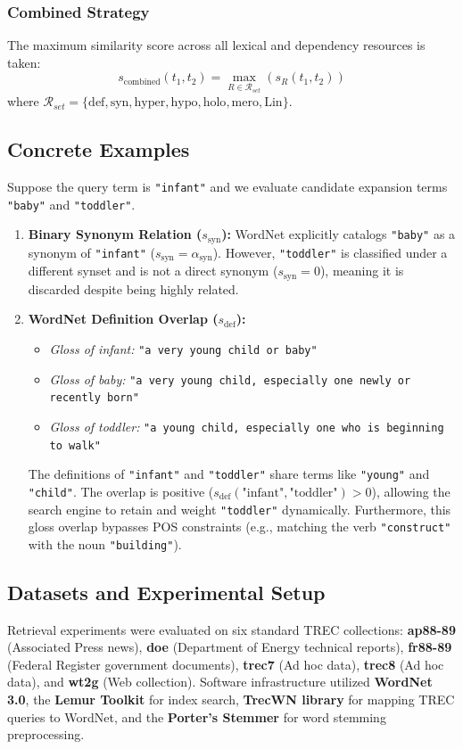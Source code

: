 \documentclass[11pt,a4paper]{article}
\begin{document}
\subsubsection{Combined Strategy}
The maximum similarity score across all lexical and dependency resources is taken:
\begin{equation}
s_{\text{combined}}(t_1, t_2) = \max_{R \in \mathcal{R}_{set}} (s_R(t_1, t_2))
\end{equation}
where $\mathcal{R}_{set} = \{\text{def}, \text{syn}, \text{hyper}, \text{hypo}, \text{holo}, \text{mero}, \text{Lin}\}$.

\subsection{Concrete Examples}
Suppose the query term is \texttt{"infant"} and we evaluate candidate expansion terms \texttt{"baby"} and \texttt{"toddler"}.
\begin{enumerate}
    \item \textbf{Binary Synonym Relation ($s_{\text{syn}}$):}
    WordNet explicitly catalogs \texttt{"baby"} as a synonym of \texttt{"infant"} ($s_{\text{syn}} = \alpha_{\text{syn}}$). However, \texttt{"toddler"} is classified under a different synset and is not a direct synonym ($s_{\text{syn}} = 0$), meaning it is discarded despite being highly related.
    \item \textbf{WordNet Definition Overlap ($s_{\text{def}}$):}
    \begin{itemize}
        \item \textit{Gloss of infant:} \texttt{"a very young child or baby"}
        \item \textit{Gloss of baby:} \texttt{"a very young child, especially one newly or recently born"}
        \item \textit{Gloss of toddler:} \texttt{"a young child, especially one who is beginning to walk"}
    \end{itemize}
    The definitions of \texttt{"infant"} and \texttt{"toddler"} share terms like \texttt{"young"} and \texttt{"child"}. The overlap is positive ($s_{\text{def}}(\text{"infant"}, \text{"toddler"}) > 0$), allowing the search engine to retain and weight \texttt{"toddler"} dynamically. Furthermore, this gloss overlap bypasses POS constraints (e.g., matching the verb \texttt{"construct"} with the noun \texttt{"building"}).
\end{enumerate}

\subsection{Datasets and Experimental Setup}
Retrieval experiments were evaluated on six standard TREC collections: \textbf{ap88-89} (Associated Press news), \textbf{doe} (Department of Energy technical reports), \textbf{fr88-89} (Federal Register government documents), \textbf{trec7} (Ad hoc data), \textbf{trec8} (Ad hoc data), and \textbf{wt2g} (Web collection). Software infrastructure utilized \textbf{WordNet 3.0}, the \textbf{Lemur Toolkit} for index search, \textbf{TrecWN library} for mapping TREC queries to WordNet, and the \textbf{Porter's Stemmer} for word stemming preprocessing.
\end{document}
